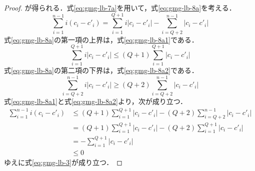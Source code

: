 \begin{proof}
  が得られる．式\ref{eq:gmg-lb-7a}を用いて，式\ref{eq:gmg-lb-8a}を考える．
  \begin{equation}
    \label{eq:gmg-lb-8a}
    \sum_{i=1}^{n-1}i(c_i-c'_i)=
    \sum_{i=1}^{Q+1}i|c_i-c'_i|-\sum_{i=Q+2}^{n-1}|c_i-c'_i|
  \end{equation}
  式\ref{eq:gmg-lb-8a}の第一項の上界は，式\ref{eq:gmg-lb-8a1}である．
  \begin{equation}
    \label{eq:gmg-lb-8a1}
    \sum_{i=1}^{Q+1}i|c_i-c'_i|\leq (Q+1)\sum_{i=1}^{Q+1}|c_i-c'_i|
  \end{equation}
  式\ref{eq:gmg-lb-8a}の第二項の下界は，式\ref{eq:gmg-lb-8a2}である．
  \begin{equation}
    \label{eq:gmg-lb-8a2}
    \sum_{i=Q+2}^{n-1}i|c_i-c'_i|\geq (Q+2)\sum_{i=Q+2}^{n-1}|c_i-c'_i|
  \end{equation}
  式\ref{eq:gmg-lb-8a1}と式\ref{eq:gmg-lb-8a2}より，次が成り立つ．
  \begin{align*}
    \sum_{i=1}^{n-1}i(c_i-c'_i)
    &\leq (Q+1)\sum_{i=1}^{Q+1}|c_i-c'_i|-(Q+2)\sum_{i=Q+2}^{n-1}|c_i-c'_i| \\
    &= (Q+1)\sum_{i=1}^{Q+1}|c_i-c'_i|-(Q+2)\sum_{i=1}^{Q+1}|c_i-c'_i| \\
    &= -\sum_{i=1}^{Q+1}|c_i-c'_i| \\
    &\leq 0
  \end{align*}
  ゆえに式\ref{eq:gmg-lb-3}が成り立つ．


\end{proof}
